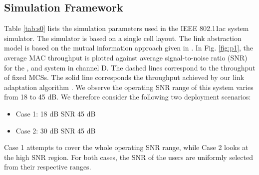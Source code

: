 \documentclass[conference]{IEEEtran}
\newcommand{\0}{\vect{0}}
\newcommand{\1}{\vect{1}}
\begin{document}
\begin{table}[!t]
\centering

\end{table}


\subsection{Simulation Framework}


Table \ref{tab:s0} lists the simulation parameters used in the IEEE 802.11ac system simulator. The simulator is based on a single cell layout. The link abstraction model is based on the mutual information approach given in \cite{Tan08JSAC}. In Fig. \ref{fig:p1}, the average MAC throughput is plotted against average signal-to-noise ratio (SNR) for the ,  and  system in channel D. The dashed lines correspond to the throughput of fixed MCSs. The solid line corresponds the throughput achieved by our link adaptation algorithm \cite{Tan08JSAC}. We observe the operating SNR range of this system varies from 18 to 45 dB. We therefore consider the following two deployment scenarios:
\begin{itemize}
\item Case 1: 18 dB  SNR  45 dB
\item Case 2: 30 dB  SNR  45 dB
\end{itemize}
Case 1 attempts to cover the whole operating SNR range, while Case 2 looks at the high SNR region. For both cases, the SNR of the users are uniformly selected from their respective ranges.
\end{document}
